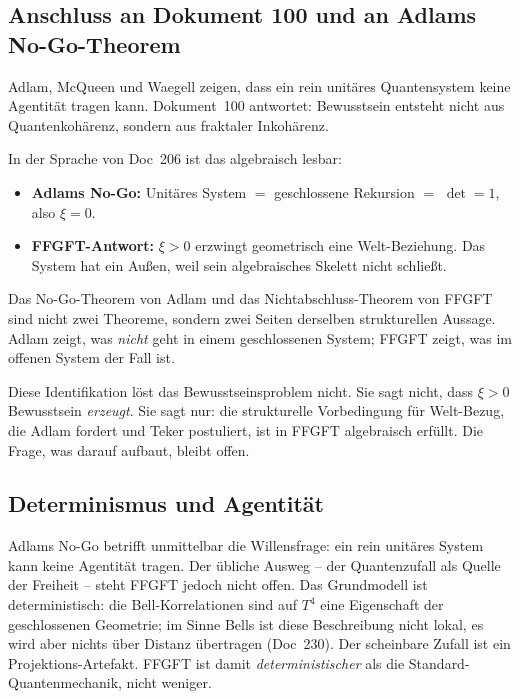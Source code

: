 \subsection{Anschluss an Dokument 100 und an Adlams No-Go-Theorem}

Adlam, McQueen und Waegell zeigen, dass ein rein unitäres Quantensystem keine Agentität tragen kann. Dokument~100 antwortet: Bewusstsein entsteht nicht aus Quantenkohärenz, sondern aus fraktaler Inkohärenz.

In der Sprache von Doc~206 ist das algebraisch lesbar:

\begin{itemize}
\item \textbf{Adlams No-Go:} Unitäres System $=$ geschlossene Rekursion $=$ $\det = 1$, also $\xi = 0$.
\item \textbf{FFGFT-Antwort:} $\xi > 0$ erzwingt geometrisch eine Welt-Beziehung. Das System hat ein Außen, weil sein algebraisches Skelett nicht schließt.
\end{itemize}

Das No-Go-Theorem von Adlam und das Nichtabschluss-Theorem von FFGFT sind nicht zwei Theoreme, sondern zwei Seiten derselben strukturellen Aussage. Adlam zeigt, was \emph{nicht} geht in einem geschlossenen System; FFGFT zeigt, was im offenen System der Fall ist.

\begin{interpretation}
Diese Identifikation löst das Bewusstseinsproblem nicht. Sie sagt nicht, dass $\xi > 0$ Bewusstsein \emph{erzeugt}. Sie sagt nur: die strukturelle Vorbedingung für Welt-Bezug, die Adlam fordert und Teker postuliert, ist in FFGFT algebraisch erfüllt. Die Frage, was darauf aufbaut, bleibt offen.
\end{interpretation}

\subsection{Determinismus und Agentität}\label{sec:brueckeA_determinismus}

Adlams No-Go betrifft unmittelbar die Willensfrage: ein rein unitäres System kann keine Agentität tragen. Der übliche Ausweg -- der Quantenzufall als Quelle der Freiheit -- steht FFGFT jedoch nicht offen. Das Grundmodell ist deterministisch: die Bell-Korrelationen sind auf $T^4$ eine Eigenschaft der geschlossenen Geometrie; im Sinne Bells ist diese Beschreibung nicht lokal, es wird aber nichts über Distanz übertragen (Doc~230). Der scheinbare Zufall ist ein Projektions-Artefakt. FFGFT ist damit \emph{deterministischer} als die Standard-Quantenmechanik, nicht weniger.

